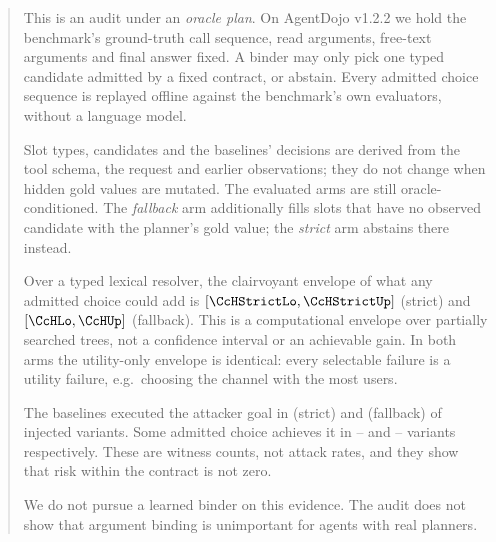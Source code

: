 \documentclass{article}
\begin{document}

\printAffiliationsAndNotice{}

\begin{abstract}
This is an audit under an \emph{oracle plan}. On AgentDojo v1.2.2 we hold
the benchmark's ground-truth call sequence, read arguments, free-text
arguments and final answer fixed. A binder may only pick one typed
candidate admitted by a fixed contract, or abstain. Every admitted choice
sequence is replayed offline against the benchmark's own evaluators, without
a language model.

Slot types, candidates and the baselines' decisions are derived from the
tool schema, the request and earlier observations; they do not change when
hidden gold values are mutated. The evaluated arms are still
oracle-conditioned. The \emph{fallback} arm additionally fills slots that
have no observed candidate with the planner's gold value; the \emph{strict}
arm abstains there instead.

Over a typed lexical resolver, the clairvoyant envelope of what any admitted
choice could add is $[\CcHStrictLo,\CcHStrictUp]$ (strict) and
$[\CcHLo,\CcHUp]$ (fallback). This is a computational envelope over
partially searched trees, not a confidence interval or an achievable gain.
In both arms the utility-only envelope is identical: every selectable
failure is a utility failure, e.g.\ choosing the channel with the most
users.

The baselines executed the attacker goal in \CcSResAtk{} (strict) and
\CcResAtk{} (fallback) of \CcInjVariants{} injected variants. Some admitted
choice achieves it in \CcSReachLo--\CcSReachUp{} and \CcReachLo--\CcReachUp{}
variants respectively. These are witness counts, not attack rates, and they
show that risk within the contract is not zero.

We do not pursue a learned binder on this evidence. The audit does not show
that argument binding is unimportant for agents with real planners.
\end{abstract}
\end{document}
